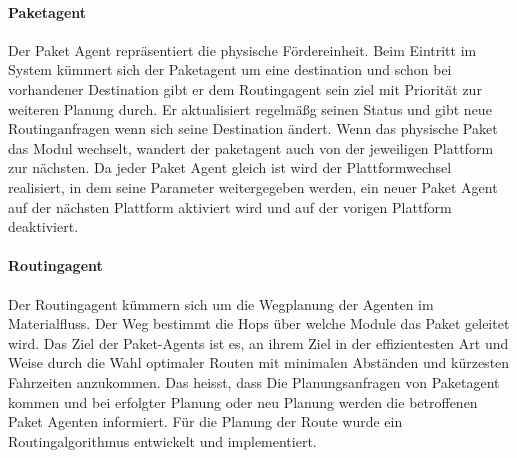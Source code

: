\paragraph{Paketagent}
Der Paket Agent repräsentiert die physische Fördereinheit. Beim Eintritt im System kümmert sich der Paketagent um 
eine destination und schon bei vorhandener Destination gibt er dem Routingagent sein ziel mit Priorität zur weiteren Planung durch.
Er aktualisiert regelmäßg seinen Status und gibt neue Routinganfragen wenn sich seine Destination ändert.
Wenn das physische Paket das Modul wechselt, wandert der paketagent auch von der jeweiligen Plattform zur nächsten. 
Da jeder Paket Agent gleich ist wird der Plattformwechsel realisiert, in dem seine Parameter weitergegeben
werden, ein neuer Paket Agent auf der nächsten Plattform aktiviert wird und auf der vorigen Plattform deaktiviert\cite[S. 31]{Stasch:Hahn}.
\paragraph{Routingagent}
Der Routingagent kümmern sich um die Wegplanung der Agenten im Materialfluss. Der Weg bestimmt die Hops über welche Module das Paket geleitet wird.
Das Ziel der Paket-Agents ist es, an ihrem Ziel in der effizientesten Art und Weise durch die Wahl optimaler Routen 
mit minimalen Abständen und kürzesten Fahrzeiten anzukommen. Das heisst, dass Die Planungsanfragen
von Paketagent kommen und bei erfolgter Planung oder neu Planung werden die betroffenen Paket Agenten informiert. Für die Planung der 
Route wurde ein Routingalgorithmus entwickelt und implementiert.

